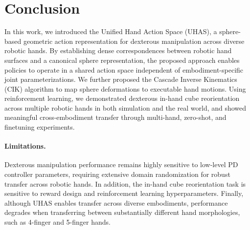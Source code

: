 \vspace{-2mm}
\section{Conclusion}
\vspace{-2mm}

In this work, we introduced the Unified Hand Action Space (UHAS), a sphere-based geometric action representation for dexterous manipulation across diverse robotic hands. By establishing dense correspondences between robotic hand surfaces and a canonical sphere representation, the proposed approach enables policies to operate in a shared action space independent of embodiment-specific joint parameterizations. We further proposed the Cascade Inverse Kinematics (CIK) algorithm to map sphere deformations to executable hand motions. Using reinforcement learning, we demonstrated dexterous in-hand cube reorientation across multiple robotic hands in both simulation and the real world, and showed meaningful cross-embodiment transfer through multi-hand, zero-shot, and finetuning experiments.

\vspace{-2mm}
\paragraph{Limitations.}
Dexterous manipulation performance remains highly sensitive to low-level PD controller parameters, requiring extensive domain randomization for robust transfer across robotic hands. In addition, the in-hand cube reorientation task is sensitive to reward design and reinforcement learning hyperparameters. Finally, although UHAS enables transfer across diverse embodiments, performance degrades when transferring between substantially different hand morphologies, such as 4-finger and 5-finger hands.